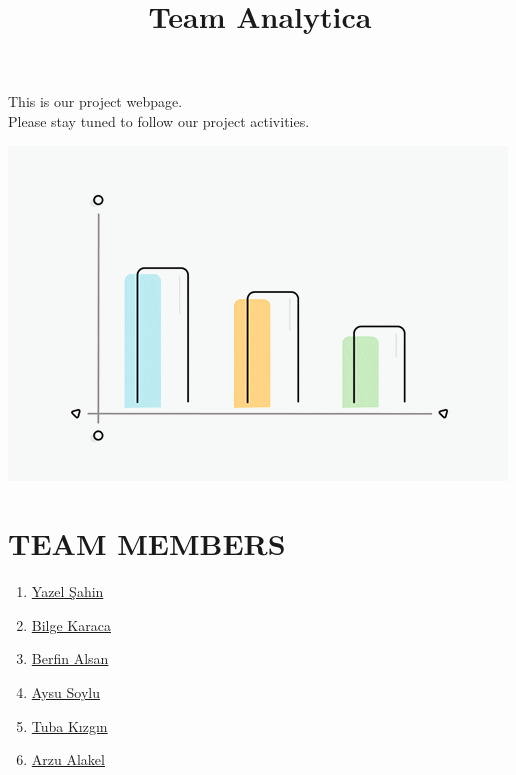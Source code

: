 \documentclass[
  11pt,
  a4paper,
  DIV=11,
  numbers=noendperiod]{scrartcl}
\title{Team Analytica}
\author{}
\date{}
\begin{document}
\maketitle


This is our project webpage.\\
Please stay tuned to follow our project activities.

\begin{center}
\includegraphics{index_files/mediabag/giphy.gif-cid=ecf05e.gif}
\end{center}

\section{\texorpdfstring{\textbf{TEAM
MEMBERS}}{TEAM MEMBERS}}\label{team-members}

\begin{enumerate}
\def\labelenumi{\arabic{enumi}.}
\item
  \href{https://emu-hacettepe-analytics.github.io/emu430-fall2024-yazelsahinlab/}{Yazel
  Şahin}
\item
  \href{https://emu-hacettepe-analytics.github.io/emu430-fall2024-BilgeKaraca/}{Bilge
  Karaca}
\item
  \href{https://emu-hacettepe-analytics.github.io/emu430-fall2024-berfinalsan/}{Berfin
  Alsan}
\item
  \href{https://emu-hacettepe-analytics.github.io/emu430-fall2024-aysusoylu/}{Aysu
  Soylu}
\item
  \href{https://emu-hacettepe-analytics.github.io/emu430-fall2024-tubikzgn/}{Tuba
  Kızgın}
\item
  \href{https://emu-hacettepe-analytics.github.io/emu430-fall2024-arzualakel/}{Arzu
  Alakel}
\end{enumerate}
\end{document}
